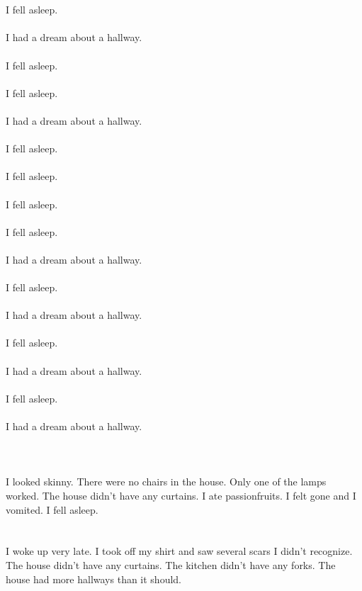 \documentclass{article}
\begin{document}
    \section{}
    I fell asleep.\\\\I had a dream about a hallway.\\\\ I fell asleep.\\\\ I fell asleep.\\\\I had a dream about a hallway.\\\\ I fell asleep.\\\\ I fell asleep.\\\\ I fell asleep.\\\\ I fell asleep.\\\\I had a dream about a hallway.\\\\ I fell asleep.\\\\I had a dream about a hallway.\\\\ I fell asleep.\\\\I had a dream about a hallway.\\\\ I fell asleep.\\\\I had a dream about a hallway.\\\\ 
    \newpage
    
    \section{}
    I looked skinny. There were no chairs in the house. Only one of the lamps worked. The house didn't have any curtains. I ate passionfruits. I felt gone and I vomited. I fell asleep.  
    \newpage
    
    \section{}
    I woke up very late. I took off my shirt and saw several scars I didn't recognize. The house didn't have any curtains. The kitchen didn't have any forks. The house had more hallways than it should.  
    \newpage
    
\end{document}
